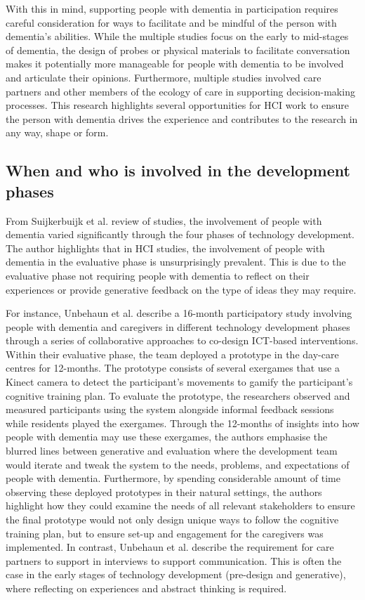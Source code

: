 With this in mind, supporting people with dementia in participation requires careful consideration for ways to facilitate and be mindful of the person with dementia's abilities. While the multiple studies focus on the early to mid-stages of dementia, the design of probes or physical materials to facilitate conversation makes it potentially more manageable for people with dementia to be involved and articulate their opinions. Furthermore, multiple studies involved care partners and other members of the ecology of care in supporting decision-making processes. This research highlights several opportunities for HCI work to ensure the person with dementia drives the experience and contributes to the research in any way, shape or form.

\subsection{When and who is involved in the development phases}
\label{BL:DevelopmentPhases}
From Suijkerbuijk et al. review of studies, the involvement of people with dementia varied significantly through the four phases of technology development. The author highlights that in HCI studies, the involvement of people with dementia in the evaluative phase is unsurprisingly prevalent. This is due to the evaluative phase not requiring people with dementia to reflect on their experiences or provide generative feedback on the type of ideas they may require. 

For instance, Unbehaun et al. describe a 16-month participatory study involving people with dementia and caregivers in different technology development phases through a series of collaborative approaches to co-design ICT-based interventions. Within their evaluative phase, the team deployed a prototype in the day-care centres for 12-months. The prototype consists of several exergames that use a Kinect camera to detect the participant's movements to gamify the participant's cognitive training plan. To evaluate the prototype, the researchers observed and measured participants using the system alongside informal feedback sessions while residents played the exergames. Through the 12-months of insights into how people with dementia may use these exergames, the authors emphasise the blurred lines between generative and evaluation where the development team would iterate and tweak the system to the needs, problems, and expectations of people with dementia. Furthermore, by spending considerable amount of time observing these deployed prototypes in their natural settings, the authors highlight how they could examine the needs of all relevant stakeholders to ensure the final prototype would not only design unique ways to follow the cognitive training plan, but to ensure set-up and engagement for the caregivers was implemented. In contrast, Unbehaun et al. describe the requirement for care partners to support in interviews to support communication. This is often the case in the early stages of technology development (pre-design and generative), where reflecting on experiences and abstract thinking is required.

